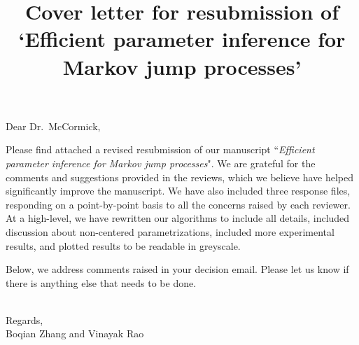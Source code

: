 \documentclass[11pt]{article}
\title{Cover letter for resubmission of `Efficient parameter inference for Markov jump processes'}
\author{}
\date{}
\begin{document}
\maketitle

\noindent Dear Dr.\ McCormick,

Please find attached a revised resubmission of our manuscript ``{\em Efficient parameter inference for Markov jump processes}". 
We are grateful for the comments and suggestions provided in the reviews, which we believe have helped significantly improve the manuscript.
We have also included three response files, responding on a point-by-point basis to all the concerns raised by each reviewer. At a high-level, we have rewritten our algorithms to include all details, included discussion about non-centered parametrizations, included more experimental results, and plotted results to be readable in greyscale. 

Below, we address comments raised in your decision email. Please let us know if there is anything else that needs to be done.

~\\Regards,\\
Boqian Zhang and Vinayak Rao
\end{document}
